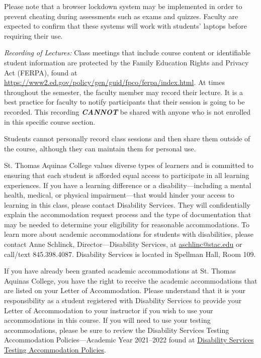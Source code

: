 \documentclass[11pt,letterpaper]{article}
\begin{document}
Please note that a browser lockdown system may be implemented in order to prevent cheating during assessments such as exams and quizzes. Faculty are expected to confirm that these systems will work with students' laptops before requiring their use. \pspace

{\itshape Recording of Lectures:} Class meetings that include course content or identifiable student information are protected by the Family Education Rights and Privacy Act (FERPA), found at \url{https://www2.ed.gov/policy/gen/guid/fpco/ferpa/index.html}. At times throughout the semester, the faculty member may record their lecture. It is a best practice for faculty to notify participants that their session is going to be recorded. This recording \textit{\bfseries CANNOT} be shared with anyone who is not enrolled in this specific course section. \pspace

Students cannot personally record class sessions and then share them outside of the course, although they can maintain them for personal use. 
\sectionbreak




St. Thomas Aquinas College values diverse types of learners and is committed to ensuring that each student is afforded equal access to participate in all learning experiences. If you have a learning difference or a disability---including a mental health, medical, or physical impairment---that would hinder your access to learning in this class, please contact Disability Services. They will confidentially explain the accommodation request process and the type of documentation that may be needed to determine your eligibility for reasonable accommodations. To learn more about academic accommodations for students with disabilities, please contact Anne Schlinck, Director---Disability Services, at \href{mailto:aschlinc@stac.edu}{aschlinc@stac.edu} or call/text 845.398.4087. Disability Services is located in Spellman Hall, Room 109. \pspace

\newpage

If you have already been granted academic accommodations at St. Thomas Aquinas College, you have the right to receive the academic accommodations that are listed on your Letter of Accommodation.  Please understand that it is your responsibility as a student registered with Disability Services to provide your Letter of Accommodation to your instructor if you wish to use your accommodations in this course. If you will need to use your testing accommodations, please be sure to review the Disability Services Testing Accommodation Policies---Academic Year  2021--2022 found at \href{https://docs.google.com/document/d/1V5iUtgypiS8kClqhSLPde7AOSZPoLu6CsIDcpiEic2w/edit?usp=sharing}{Disability Services Testing Accommodation Policies}.
\sectionbreak
\end{document}
